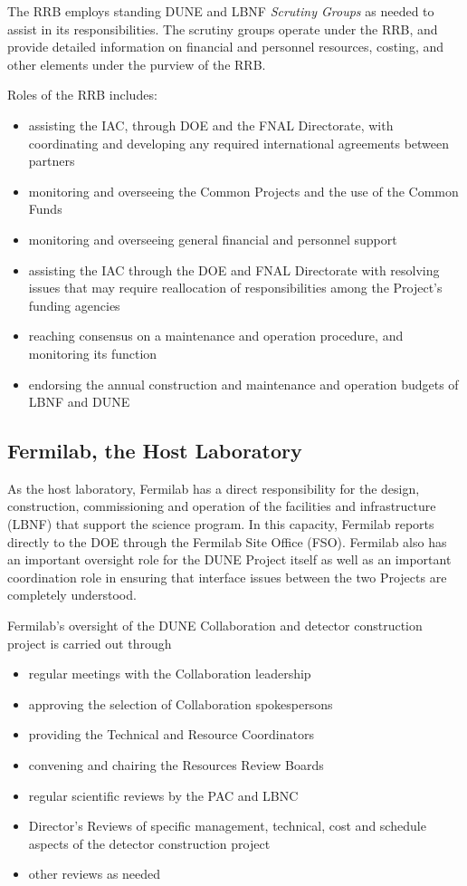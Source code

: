 The RRB %
employs standing DUNE and LBNF \textit{Scrutiny Groups} as needed
to assist in its responsibilities. The scrutiny groups operate
under the RRB, and provide detailed information on financial and
personnel resources, costing, and other elements under the purview of the RRB.

Roles of the RRB includes:

\begin{itemize}
\item assisting the IAC, through DOE and the FNAL Directorate,
with coordinating and developing any required international
agreements between partners
\item monitoring and overseeing the Common Projects and the
use of the Common Funds
\item monitoring and overseeing general financial and personnel support
\item assisting the IAC through the DOE and FNAL Directorate
with resolving issues that may require reallocation of responsibilities
among the Project's funding agencies
\item reaching consensus on a maintenance and operation procedure,
and monitoring its function
\item  endorsing the annual construction and maintenance and operation
budgets of LBNF and DUNE
\end{itemize}

\subsection{Fermilab, the Host Laboratory}

As the host laboratory, Fermilab has a direct responsibility for the design,
construction, commissioning and operation of the facilities and
infrastructure (LBNF) that support the science program. 
In this capacity, Fermilab reports
directly to the DOE through the Fermilab Site Office (FSO).
Fermilab also has an important oversight role for the DUNE Project
itself as well as an important coordination role in ensuring that
interface issues between the two Projects are completely understood.

Fermilab's oversight of the DUNE Collaboration and detector
construction project is carried out through
\begin{itemize}
\item regular meetings with the Collaboration leadership
\item approving the selection of Collaboration spokespersons
\item  providing the Technical and Resource Coordinators
\item  convening and chairing the Resources Review Boards
\item  regular scientific reviews by the PAC and LBNC
\item  Director's Reviews of specific management, technical,
cost and schedule aspects of the detector construction project
\item other reviews as needed
\end{itemize}

